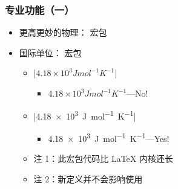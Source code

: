 \begin{frame}[fragile]
\frametitle{专业功能（一）}
\begin{itemize}
  \item 更高更妙的物理： 宏包

     \pause

  \item 国际单位： 宏包

    \begin{itemize}
      \item |$4.18 \times 10^3 J mol^{-1} K^{-1}$|

        \begin{itemize}
          \item $4.18 \times 10^3 J mol^{-1} K^{-1}$---No!
        \end{itemize}

      \item |\SI{4.18e3}{J.mol^{-1}.K^{-1}}|

        \begin{itemize}
          \item \SI{4.18e3}{J.mol^{-1}.K^{-1}}---Yes!
        \end{itemize} \pause

      \item 注 1：此宏包代码比 \LaTeX{} 内核还长 \pause
      \item 注 2：新定义并不会影响使用
    \end{itemize}
\end{itemize}
\end{frame}


